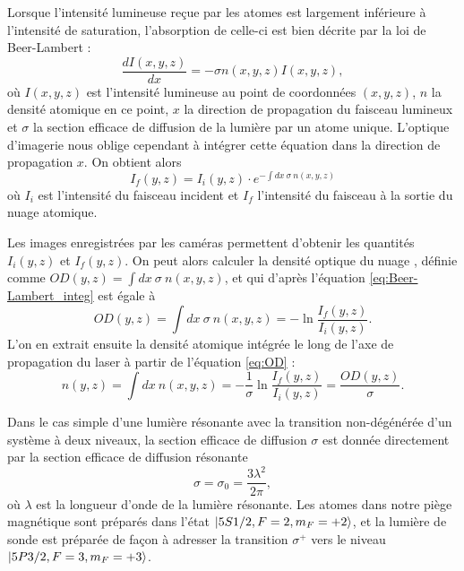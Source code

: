 Lorsque l'intensité lumineuse reçue par les atomes est largement inférieure à l'intensité de saturation, l'absorption de celle-ci est bien décrite par la loi de Beer-Lambert :
\begin{equation}
\label{eq:Beer-Lambert}
\frac{dI(x,y,z)}{dx} = -\sigma n(x,y,z) I(x,y,z),
\end{equation}
où $I(x,y,z)$ est l'intensité lumineuse au point de coordonnées $(x,y,z)$, $n$ la densité atomique en ce point, $x$ la direction de propagation du faisceau lumineux et $\sigma$ la section efficace de diffusion de la lumière par un atome unique.
L'optique d'imagerie nous oblige cependant à intégrer cette équation dans la direction de propagation $x$.
On obtient alors 
\begin{equation}
\label{eq:Beer-Lambert_integ}
I_f(y,z) = I_i (y,z)\cdot e^{-\int dx~\sigma~n(x,y,z)}
\end{equation}
où $I_i$ est l'intensité du faisceau incident et $I_f$ l'intensité du faisceau à la sortie du nuage atomique.

Les images enregistrées par les caméras permettent d'obtenir les quantités $I_i(y,z)$ et $I_f(y,z)$.
On peut alors calculer la densité optique du nuage , définie comme $OD(y,z) = \int dx~\sigma~n(x,y,z)$, et qui d'après l'équation \eqref{eq:Beer-Lambert_integ} est égale à
\begin{equation}
\label{eq:OD}
OD(y,z) = \int dx~\sigma~n(x,y,z) = -\ln \frac{I_f(y,z)}{I_i(y,z)}.
\end{equation}
L'on en extrait ensuite la densité atomique intégrée le long de l'axe de propagation du laser à partir de l'équation \eqref{eq:OD} :
\begin{equation}
\label{eq:atomic_density}
n(y,z) = \int{dx~n(x,y,z)} = -\frac{1}{\sigma} \ln \frac{I_f(y,z)}{I_i(y,z)} = \frac{OD(y,z)}{\sigma}.
\end{equation}
		
Dans le cas simple d'une lumière résonante avec la transition non-dégénérée d'un système à deux niveaux, la section efficace de diffusion $\sigma$ est donnée directement par la section efficace de diffusion résonante 
\begin{equation}
\sigma = \sigma_0 = \frac{3\lambda^2}{2\pi},
\end{equation}
où $\lambda$ est la longueur d'onde de la lumière résonante.
Les atomes dans notre piège magnétique sont préparés dans l'état $\ket{5S1/2,F=2,m_F=+2}$, et la lumière de sonde est préparée de façon à adresser la transition $\sigma^+$ vers le niveau $\ket{5P3/2,F=3,m_F=+3}$.

